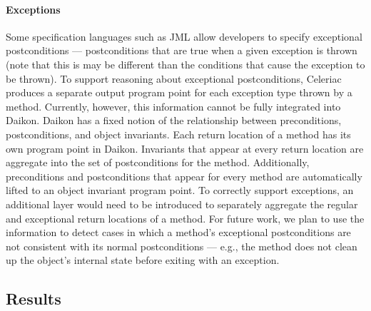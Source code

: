 
 \paragraph{Exceptions}
 Some specification languages such as JML allow developers to specify
 exceptional postconditions --- postconditions that are true when a
 given exception is thrown (note that this is may be different than the
 conditions that cause the exception to be thrown).
 To support reasoning about exceptional postconditions, Celeriac
 produces a separate output program point for each exception type
 thrown by a method. Currently, however, this information cannot be
 fully integrated into Daikon.
 Daikon has a fixed notion of the relationship between preconditions,
 postconditions, and object invariants. Each return location of a
 method has its own program point in Daikon. Invariants that appear at
 every return location are aggregate into the set of postconditions for
 the method. Additionally, preconditions and postconditions that appear
 for every method are automatically lifted to an object invariant
 program point.
 To correctly support exceptions, an additional layer would need to be
 introduced to separately aggregate the regular and exceptional return
 locations of a method.
%
 For future work, we plan to use the information to detect cases in
 which a method's exceptional postconditions are not consistent with
 its normal postconditions --- e.g., the method does not clean up the
 object's internal state before exiting with an exception.


\subsection{Results}

